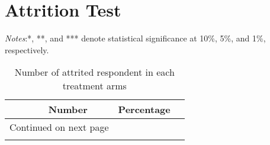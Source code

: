 \documentclass[10pt,a4paper]{article}
\begin{document}
\section{Attrition Test}

\begin{center}
	{\tiny \tabcolsep=1pt  %
		\begin{ThreePartTable}
			\begin{TableNotes}[flushleft]
				\tiny
				\item \textit{Notes}:*, **, and *** denote statistical significance at 10\%, 5\%, and 1\%, respectively.
			\end{TableNotes}
			\begin{longtable}{l*{3}{c}}
				\caption{Number of attrited respondent in each treatment arms}\label{tab:attrition_cash_num}					\\
				\toprule
				\hline 
				&\multicolumn{1}{p{2cm}}{\centering Number}
				&\multicolumn{1}{p{2cm}}{\centering Percentage} \\
				\hline 
				\endfirsthead
				\hline
				\endhead
				\hline
				\multicolumn{2}{r}{{Continued on next page}} \\
				\endfoot
				
				\bottomrule
				\insertTableNotes
				\endlastfoot
				
			\end{longtable}
		\end{ThreePartTable}
	}
\end{center}
\end{document}
